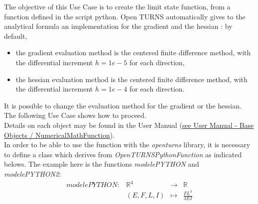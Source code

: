 \renewcommand{\filename}{docUCLSF_PythonScript.tex}
\renewcommand{\filetitle}{UC : From a fonction defined in the script python}

\HeaderIIILevel

\label{OpenTURNSPythonFunction}



The objective of this Use Case is to create the limit state function, from a function defined in the script python. Open TURNS automatically gives to the analytical formula an implementation for the gradient and the hessian : by default,
\begin{itemize}
\item the gradient evaluation method is the  centered finite difference method, with the differential increment $h=1e-5$ for each direction,
\item the hessian evaluation method is the  centered finite difference method, with the differential increment $h=1e-4$ for each direction.
\end{itemize}
It is possible to change the evaluation method for the gradient or the hessian. The following Use Case shows how to proceed.\\


Details on each object may be found in the User Manual  (\href{OpenTURNS_UserManual_TUI.pdf}{see User Manual - Base Objects / NumericalMathFunction}).\\


In order to be able to use the function with the {\itshape openturns} library, it is necessary to define a class which derives from {\itshape OpenTURNSPythonFunction} as indicated belows. The example here is the functions {\itshape modelePYTHON} and {\itshape modelePYTHON2}:
\begin{equation}
  \begin{array}{l|lcl}
    modelePYTHON : & \mathbb{R}^4 & \rightarrow & \mathbb{R} \\
    & (E,F,L,I)    & \mapsto     & \displaystyle \frac{FL^3}{3EI}
  \end{array}
\end{equation}

